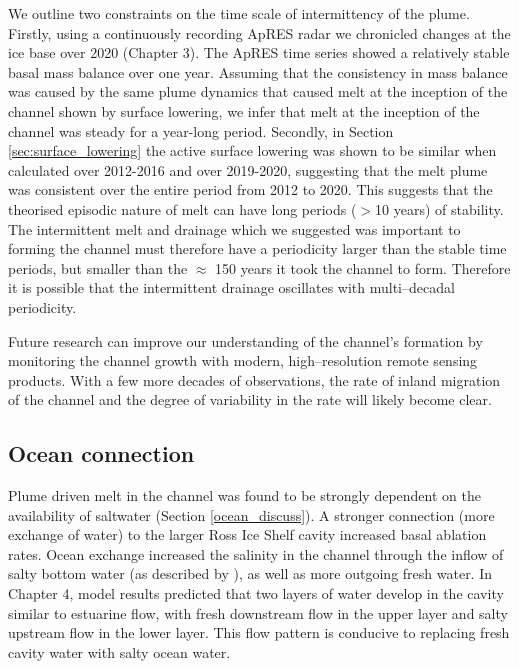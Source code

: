 We outline two constraints on the time scale of intermittency of the plume. Firstly, using a continuously recording ApRES radar we chronicled changes at the ice base over 2020 (Chapter 3). The ApRES time series showed a relatively stable basal mass balance over one year. Assuming that the consistency in mass balance was caused by the same plume dynamics that caused melt at the inception of the channel shown by surface lowering, we infer that melt at the inception of the channel was steady for a year-long period. Secondly, in Section \ref{sec:surface_lowering} the active surface lowering was shown to be similar when calculated over 2012-2016 and over 2019-2020, suggesting that the melt plume was consistent over the entire period from 2012 to 2020. This suggests that the theorised episodic nature of melt can have long periods ($>$10 years) of stability.  The intermittent melt and drainage which we suggested was important to forming the channel must therefore have a periodicity larger than the stable time periods, but smaller than the $\approx$ 150 years it took the channel to form. Therefore it is possible that the intermittent drainage oscillates with multi--decadal periodicity.

Future research can improve our understanding of the channel's formation by monitoring the channel growth with modern, high--resolution remote sensing products. With a few more decades of observations, the rate of inland migration of the channel and the degree of variability in the rate will likely become clear.

\subsection{Ocean connection}

Plume driven melt in the channel was found to be strongly dependent on the availability of saltwater (Section \ref{ocean_discuss}).   A stronger connection (more exchange of water) to the larger Ross Ice Shelf cavity increased basal ablation rates.  Ocean exchange increased the salinity in the channel through the  inflow of salty bottom water (as described by \cite{goldberg2019accurately}), as well as more outgoing fresh water. In Chapter 4, model results predicted that two layers of water develop in the cavity similar to estuarine flow, with fresh downstream flow in the upper layer and salty upstream flow in the lower layer. This flow pattern is conducive to replacing fresh cavity water with salty ocean water. 

